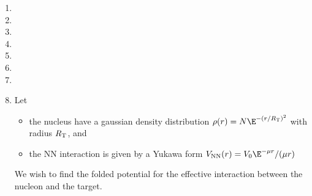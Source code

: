 \documentclass[fleqn, 12pt]{article}
\begin{document}
\begin{enumerate}

\item %

\item %

\item %

\item %

\item %

\item %

\item %

\item Let
  \begin{itemize}
  \item the nucleus have a gaussian density distribution
    $\rho(r) = N \E^{-(r / R_{\text T})^2}$ with radius $R_{\text T}$, and
  \item the NN interaction is given by a Yukawa form
    $V_{\text{NN}}(r) = V_0 \E^{-\mu r} / (\mu r)$
  \end{itemize}
  We wish to find the folded potential for the effective interaction between
  the nucleon and the target.


\end{enumerate}
\end{document}
